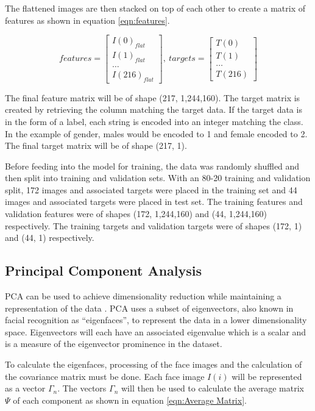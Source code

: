 \documentclass[journal]{new-aiaa}
\begin{document}
The flattened images are then stacked on top of each other to create a matrix of features as shown in equation \ref{eqn:features}.

\begin{equation}\label{eqn:features}
  features=\begin{bmatrix} I(0)_{flat} \\ I(1)_{flat} \\ \dots \\ I(216)_{flat} \end{bmatrix},\ targets=\begin{bmatrix} T(0) \\ T(1) \\ \dots \\ T(216) \end{bmatrix}
\end{equation}

The final feature matrix will be of shape (217, 1,244,160).
The target matrix is created by retrieving the column matching the target data.
If the target data is in the form of a label, each string is encoded into an integer matching the class.
In the example of gender, males would be encoded to 1 and female encoded to 2.
The final target matrix will be of shape (217, 1).

Before feeding into the model for training, the data was randomly shuffled and then split into training and validation sets.
With an 80-20 training and validation split, 172 images and associated targets were placed in the training set and 44 images and associated targets were placed in test set.
The training features and validation features were of shapes (172, 1,244,160) and (44, 1,244,160) respectively.
The training targets and validation targets were of shapes (172, 1) and (44, 1) respectively.

\subsection{Principal Component Analysis}\label{sec:Model:Eigenfaces}
PCA can be used to achieve dimensionality reduction while maintaining a representation of the data \cite{abdi2010principal}.
PCA uses a subset of eigenvectors, also known in facial recognition as ``eigenfaces'', to represent the data in a lower dimensionality space.
Eigenvectors will each have an associated eigenvalue which is a scalar and is a measure of the eigenvector prominence in the dataset. 

To calculate the eigenfaces, processing of the face images and the calculation of the covariance matrix must be done.
Each face image $I(i)$ will be represented as a vector $\varGamma_n$. 
The vectors $\varGamma_n$ will then be used to calculate the average matrix $\Psi$ of each component as shown in equation \ref{eqn:Average Matrix}.
\end{document}
